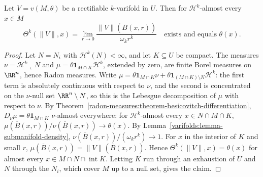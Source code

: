 \begin{theorem}\label{varifolds:theorem-rectifiable-density}
Let $V = v(M, \theta)$ be a rectifiable $k$-varifold in $U$. Then for $\mathcal{H}^k$-almost every $x \in M$
\[
\Theta^k(\|V\|, x) = \lim_{r \to 0}\frac{\|V\|(\overline{B}(x, r))}{\omega_kr^k} \quad\text{exists and equals } \theta(x).
\]
\end{theorem}

\begin{proof}
Let $N = N_i$ with $\mathcal{H}^k(N) < \infty$, and let $K \subseteq U$ be compact. The measures $\nu = \mathcal{H}^k\llcorner N$ and $\mu = \theta\mathbf{1}_{M \cap K}\mathcal{H}^k$, extended by zero, are finite Borel
measures on $\RR^n$, hence Radon measures. Write $\mu = \theta\mathbf{1}_{M \cap K}\nu + \theta\mathbf{1}_{(M \cap K) \setminus N}\mathcal{H}^k$: the first term is absolutely continuous with respect to $\nu$, and
the second is concentrated on the $\nu$-null set $\RR^n \setminus N$, so this is the Lebesgue decomposition of $\mu$ with respect to $\nu$. By
Theorem~\ref{radon-measures:theorem-besicovitch-differentiation}, $D_\nu\mu = \theta\mathbf{1}_{M \cap K}$ $\nu$-almost everywhere: for $\mathcal{H}^k$-almost every $x \in N \cap M \cap K$,
$\mu(\overline{B}(x, r))/\nu(\overline{B}(x, r)) \to \theta(x)$. By Lemma~\ref{varifolds:lemma-submanifold-density}, $\nu(\overline{B}(x, r))/(\omega_kr^k) \to 1$. For $x$ in the interior of $K$ and small $r$,
$\mu(\overline{B}(x, r)) = \|V\|(\overline{B}(x, r))$. Hence $\Theta^k(\|V\|, x) = \theta(x)$ for almost every $x \in M \cap N \cap \operatorname{int}K$. Letting $K$ run through an exhaustion of $U$ and $N$ through the
$N_i$, which cover $M$ up to a null set, gives the claim.
\end{proof}

